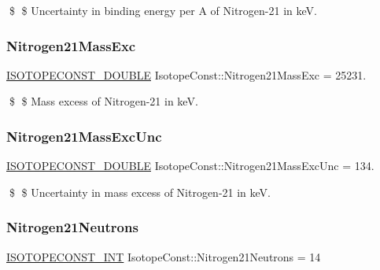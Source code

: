 \$ \$ Uncertainty in binding energy per A of Nitrogen-\/21 in keV. \mbox{\label{group___isotope_const-_nitrogen-_n21_ga968aba2d40d545db0c086c12d7693024}} 
\subsubsection{\texorpdfstring{Nitrogen21\+Mass\+Exc}{Nitrogen21MassExc}}
{\footnotesize\ttfamily \mbox{\hyperlink{group___isotope_const-_macros_ga8f45a7272ce02c0b4c65c44636ed719a}{I\+S\+O\+T\+O\+P\+E\+C\+O\+N\+S\+T\+\_\+\+D\+O\+U\+B\+LE}} Isotope\+Const\+::\+Nitrogen21\+Mass\+Exc = 25231.}

\$ \$ Mass excess of Nitrogen-\/21 in keV. \mbox{\label{group___isotope_const-_nitrogen-_n21_gab59fef0e052091c3f047b8d85a7a39f1}} 
\subsubsection{\texorpdfstring{Nitrogen21\+Mass\+Exc\+Unc}{Nitrogen21MassExcUnc}}
{\footnotesize\ttfamily \mbox{\hyperlink{group___isotope_const-_macros_ga8f45a7272ce02c0b4c65c44636ed719a}{I\+S\+O\+T\+O\+P\+E\+C\+O\+N\+S\+T\+\_\+\+D\+O\+U\+B\+LE}} Isotope\+Const\+::\+Nitrogen21\+Mass\+Exc\+Unc = 134.}

\$ \$ Uncertainty in mass excess of Nitrogen-\/21 in keV. \mbox{\label{group___isotope_const-_nitrogen-_n21_ga383dd44d2b9820f8741bb43261df66e9}} 
\subsubsection{\texorpdfstring{Nitrogen21\+Neutrons}{Nitrogen21Neutrons}}
{\footnotesize\ttfamily \mbox{\hyperlink{group___isotope_const-_macros_ga5f18360b3e99483a35c32d789e62621c}{I\+S\+O\+T\+O\+P\+E\+C\+O\+N\+S\+T\+\_\+\+I\+NT}} Isotope\+Const\+::\+Nitrogen21\+Neutrons = 14}

